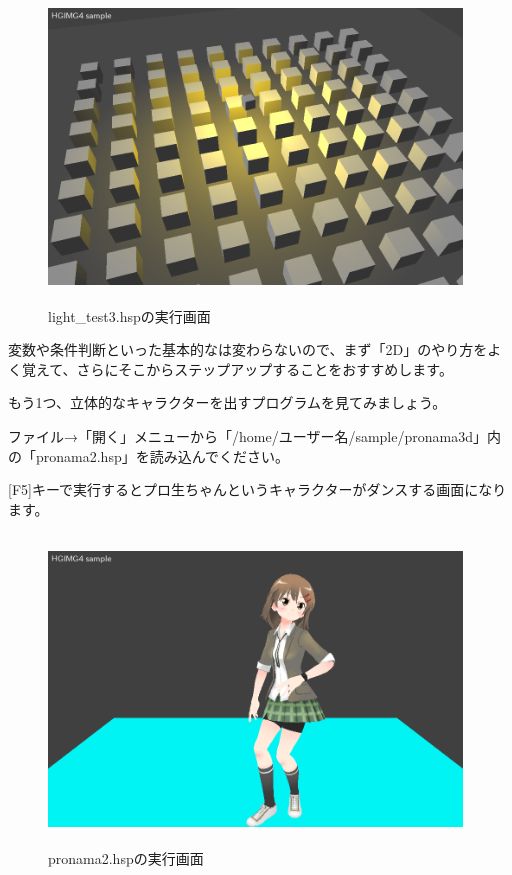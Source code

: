 \begin{figure}[H]
    \begin{center}
      \includegraphics[keepaspectratio,width=10.971cm,height=8.229cm]{text04-img/s_lighttest3.png}
      \caption{light\_test3.hspの実行画面}
    \end{center}
    \label{fig:prog_menu}
\end{figure}


変数や条件判断といった基本的なは変わらないので、まず「2D」のやり方をよく覚えて、さらにそこからステップアップすることをおすすめします。

もう1つ、立体的なキャラクターを出すプログラムを見てみましょう。


ファイル→「開く」メニューから「/home/ユーザー名/sample/pronama3d」内の「pronama2.hsp」を読み込んでください。

[F5]キーで実行するとプロ生ちゃんというキャラクターがダンスする画面になります。


\begin{figure}[H]
    \begin{center}
      \includegraphics[keepaspectratio,width=10.971cm,height=8.229cm]{text04-img/s_pronama2.png}
      \caption{pronama2.hspの実行画面}
    \end{center}
    \label{fig:prog_menu}
\end{figure}

